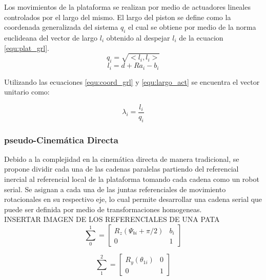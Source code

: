 \documentclass[letterpaper, 12pt]{article}
\begin{document}
Los movimientos de la plataforma se realizan por medio de actuadores lineales controlados 
por el largo del mismo. El largo del piston se define como la coordenada generalizada del 
sistema $q_i$ el cual se obtiene por medio de la norma euclideana del vector de largo 
$l_i$ obtenido al despejar $l_i$ de la ecuacion \ref{equ:plat_grl}.
\begin{equation} \label{equ:coord_grl}
q_i = \sqrt{<l_i,l_i>}
\end{equation}
\begin{equation} \label{equ:largo_act}
l_i = d + Ra_i - b_i
\end{equation}

Utilizando las ecuaciones \ref{equ:coord_grl} y \ref{equ:largo_act} se encuentra el vector unitario como:

\begin{equation} \label{equ:vec_U}
\lambda_i = \frac{l_i}{q_i}
\end{equation}

\subsubsection{pseudo-Cinemática Directa}
Debido a la complejidad en la cinemática directa de manera tradicional, se propone 
dividir cada una de las cadenas paralelas partiendo del referencial inercial al referencial 
local de la plataforma tomando cada cadena como un robot serial. Se asignan a cada una de 
las juntas referenciales de movimiento rotacionales en su respectivo eje, lo cual permite 
desarrollar una cadena serial que puede ser definida por medio de transformaciones 
homogeneas.\\

INSERTAR IMAGEN DE LOS REFERENCIALES DE UNA PATA\\

\begin{equation}
\sum_0^1 = \begin{bmatrix}
R_z(\Psi_{bi} + \pi/2) & b_i\\
0 & 1
\end{bmatrix}
\end{equation}

\begin{equation}
\sum_1^2 = \begin{bmatrix}
R_y(\theta_{1i}) & 0\\
0 & 1
\end{bmatrix}
\end{equation}
\end{document}
